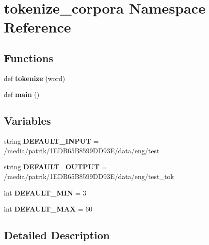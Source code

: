 \hypertarget{namespacetokenize__corpora}{}\section{tokenize\+\_\+corpora Namespace Reference}
\label{namespacetokenize__corpora}
\subsection*{Functions}
\begin{DoxyCompactItemize}
\item 
def {\bfseries tokenize} (word)\hypertarget{namespacetokenize__corpora_ad1697e0a0c7fa729aa77958c89f404bc}{}\label{namespacetokenize__corpora_ad1697e0a0c7fa729aa77958c89f404bc}

\item 
def {\bfseries main} ()\hypertarget{namespacetokenize__corpora_ab3c46d258d077b4d4a6d526c663459e1}{}\label{namespacetokenize__corpora_ab3c46d258d077b4d4a6d526c663459e1}

\end{DoxyCompactItemize}
\subsection*{Variables}
\begin{DoxyCompactItemize}
\item 
string {\bfseries D\+E\+F\+A\+U\+L\+T\+\_\+\+I\+N\+P\+UT} = \textquotesingle{}/media/patrik/1\+E\+D\+B65\+B8599\+D\+D93\+E/data/eng/test\textquotesingle{}\hypertarget{namespacetokenize__corpora_a60a1a474697d3f339d2a94072abb9b49}{}\label{namespacetokenize__corpora_a60a1a474697d3f339d2a94072abb9b49}

\item 
string {\bfseries D\+E\+F\+A\+U\+L\+T\+\_\+\+O\+U\+T\+P\+UT} = \textquotesingle{}/media/patrik/1\+E\+D\+B65\+B8599\+D\+D93\+E/data/eng/test\+\_\+tok\textquotesingle{}\hypertarget{namespacetokenize__corpora_a17c24402ba7d326945542765d5d7bf5d}{}\label{namespacetokenize__corpora_a17c24402ba7d326945542765d5d7bf5d}

\item 
int {\bfseries D\+E\+F\+A\+U\+L\+T\+\_\+\+M\+IN} = 3\hypertarget{namespacetokenize__corpora_ac211705f6e5a58383d0010404c84f675}{}\label{namespacetokenize__corpora_ac211705f6e5a58383d0010404c84f675}

\item 
int {\bfseries D\+E\+F\+A\+U\+L\+T\+\_\+\+M\+AX} = 60\hypertarget{namespacetokenize__corpora_a03ece165fd262ceed8736102539afc26}{}\label{namespacetokenize__corpora_a03ece165fd262ceed8736102539afc26}

\end{DoxyCompactItemize}


\subsection{Detailed Description}
\begin{DoxyVerb}\end{DoxyVerb}
 